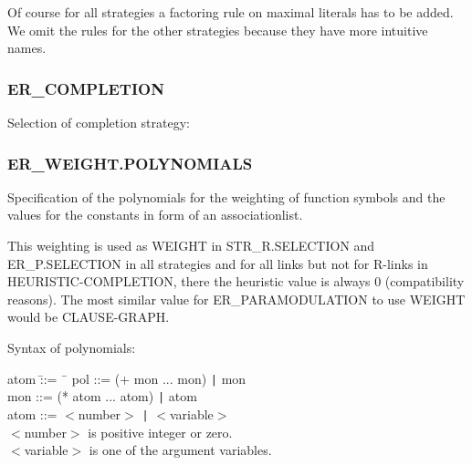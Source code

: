 Of course for all strategies a factoring rule on maximal literals has
to be added. We omit the rules for the other strategies because they have
more intuitive names.

\pagebreak[3]

\subsubsection{ER\_COMPLETION }
  
\label{ercompletion}

  Selection of completion strategy:


\subsubsection{ER\_WEIGHT.POLYNOMIALS}
\label{erweightpolynomials}
  

Specification of the polynomials for the weighting of function symbols and
the values for the constants in form of an associationlist.

This weighting is used as WEIGHT in STR\_R.SELECTION and ER\_P.SELECTION
in all strategies and for all links but not for
R-links in HEURISTIC-COMPLETION, there the heuristic value is always 0 (compatibility reasons).
The most similar value for ER\_PARAMODULATION to use WEIGHT would be CLAUSE-GRAPH.

Syntax of polynomials:

\begin{tabbing}		
atom \quad \= ::= \quad \= \ \kill		    
pol \> ::= \> (+ mon ... mon) {\tt |} mon\\
mon \> ::= \> (* atom ... atom) {\tt |} atom\\
atom \> ::= \> $<$number$>$ {\tt |} $<$variable$>$\\
$<$number$>$ \>\> is positive integer or zero.\\
$<$variable$>$ \>\> is one of the argument variables.
\end{tabbing}

